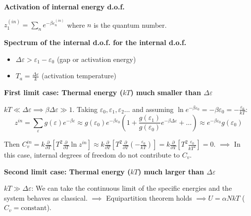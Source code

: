 \documentclass[12pt,a4paper]{report}
\newcommand{\esp}{\vspace{0.5cm}}
\begin{document}
	\esp
	
	\noindent \textbf{Activation of internal energy d.o.f.}
	
	\esp
	
	$z_1^{(in)} = \sum_{n} e^{-\beta \varepsilon_n^{(in)}}$ where $n$ is the quantum number.
	
	\esp
	
	\noindent \textbf{Spectrum of the internal d.o.f. for the internal d.o.f.}
	
	\begin{itemize}
		\item $\Delta \varepsilon > \varepsilon_1 - \varepsilon_0$ (gap or activation energy)
		\item $T_a = \frac{\Delta \varepsilon}{k}$ (activation temperature)
	\end{itemize}
	
	\esp
	
	\noindent \textbf{First limit case: Thermal energy ($kT$) much smaller than $\Delta \varepsilon$}
	
	\esp
	
	$kT \ll \Delta \varepsilon \implies \beta \Delta \varepsilon \gg 1$.
	Taking $\varepsilon_0, \varepsilon_1, \varepsilon_2 \dots$ and assuming $\ln e^{-\beta \varepsilon_0} = -\beta \varepsilon_0 = -\frac{\varepsilon_0}{kT}$:
	\begin{equation}
		z^{in} = \sum_{\varepsilon} g(\varepsilon) e^{-\beta \varepsilon} \approx g(\varepsilon_0) e^{-\beta \varepsilon_0} \left( 1 + \frac{g(\varepsilon_1)}{g(\varepsilon_0)} e^{-\beta \Delta \varepsilon} + \dots \right) \approx e^{-\beta \varepsilon_0} g(\varepsilon_0)
	\end{equation}
	
	\esp
	
	Then $C_v^{in} = k \frac{\partial}{\partial T} \left[ T^2 \frac{\partial}{\partial T} \ln z^{in} \right] \approx k \frac{\partial}{\partial T} \left[ T^2 \frac{\partial}{\partial T} \left( -\frac{\varepsilon_0}{kT} \right) \right] = k \frac{\partial}{\partial T} \left[ T^2 \frac{\varepsilon_0}{kT^2} \right] = 0$.
	$\implies$ In this case, internal degrees of freedom do not contribute to $C_v$.
	
	\esp
	
	\noindent \textbf{Second limit case: Thermal energy ($kT$) much larger than $\Delta \varepsilon$}
	
	\esp
	
	$kT \gg \Delta \varepsilon$: We can take the continuous limit of the specific energies and the system behaves as classical.
	$\implies$ Equipartition theorem holds $\implies U = \alpha NkT$ ($C_v = \text{constant}$).
	
\end{document}

